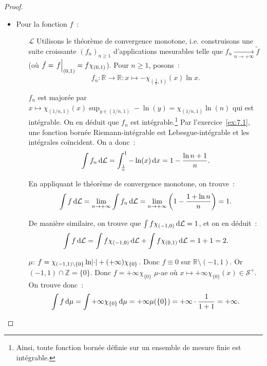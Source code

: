 \documentclass{article}
\theoremstyle{definition}
\newcommand{\restr}[2]{\left.#1\vphantom{\big|}\right|_{#2}}
\newcommand{\pinfty}{{+\infty}}
\newcommand{\Z}{{\mathbb Z}}
\newcommand{\R}{{\mathbb R}}
\begin{document}
\begin{proof}~
\begin{itemize}
	\item Pour la fonction $f$~:
	\begin{itemize}
		\item[$\mathcal L$] Utilisons le théorème de convergence monotone, i.e. construisons une suite croissante $(f_n)_{n \geq 1}$ d'applications mesurables telle que
		$f_n \xrightarrow[n \to \pinfty]{} \tilde f$ (où $\tilde f = \restr f{(0, 1)} = f\chi_{(0, 1)}$). Pour $n \geq 1$, posons~:
		\[f_n : \R \to \R : x \mapsto -\chi_{(\frac 1n, 1)}(x)\ln x.\]

		$f_n$ est majorée par $x \mapsto \chi_{(1/n, 1)}(x)\sup_{y \in (1/n, 1)}-\ln(y) = \chi_{(1/n, 1)}\ln(n)$ qui est intégrable. On en déduit que $f_n$ est intégrable.\footnote{
		Ainsi, toute fonction bornée définie sur un ensemble de mesure finie est intégrable.} Par l'exercice~\ref{ex:7.1}, une fonction bornée Riemann-intégrable est Lebesgue-intégrable et
		les intégrales coïncident. On a donc~:
		\[\int f_n\dif\mathcal L = \int_{\frac 1n}^1-\ln(x)\dif x = 1 - \frac {\ln n+1}n.\]

		En appliquant le théorème de convergence monotone, on trouve~:
		\[\int f\dif\mathcal L = \lim_{n \to \pinfty}\int f_n\dif\mathcal L = \lim_{n \to \pinfty}\left(1 - \frac {1+\ln n}n\right) = 1.\]

		De manière similaire, on trouve que $\int f\chi_{(-1, 0)}\dif\mathcal L = 1$, et on en déduit~:
		\[\int f\dif\mathcal L = \int f\chi_{(-1, 0)}\dif\mathcal L + \int f\chi_{(0, 1)}\dif\mathcal L = 1+1 = 2.\]
		\item[$\mu$:]       $f = \chi_{(-1, 1) \setminus \{0\}}\ln\abs \cdot + (\pinfty)\chi_{\{0\}}$. Donc $f \equiv 0$ sur $\R \setminus (-1, 1)$. Or $(-1, 1) \cap \Z = \{0\}$.
		Donc $f = \pinfty\chi_{\{0\}}$ $\mu$-ae où $x \mapsto \pinfty\chi_{\{0\}}(x) \in \mathcal S^+$. On trouve donc~:
		\[\int f\dif\mu = \int \pinfty\chi_{\{0\}}\dif\mu = \pinfty\mu(\{0\}) = \pinfty \cdot \frac 1{1+1} = \pinfty.\]


\end{itemize}
\end{itemize}
\end{proof}
\end{document}
